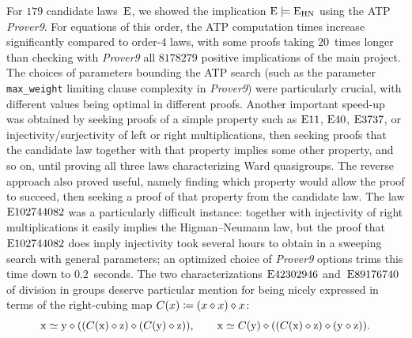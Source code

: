 For $179$ candidate laws~$\mathrm{E}$, we showed the implication $\mathrm{E}\models\mathrm{E}_{\mathrm{HN}}$ using the ATP \emph{Prover9}.  For equations of this order, the ATP computation times increase significantly compared to order-$4$ laws, with some proofs taking $20$~times longer than checking with \emph{Prover9} all $\num{8178279}$ positive implications of the main project.  The choices of parameters bounding the ATP search (such as the parameter \texttt{max\_weight} limiting clause complexity in \emph{Prover9}) were particularly crucial, with different values being optimal in different proofs.  Another important speed-up was obtained by seeking proofs of a simple property such as $\mathrm{E}11$, $\mathrm{E}40$, $\mathrm{E}3737$, or injectivity/surjectivity of left or right multiplications, then seeking proofs that the candidate law together with that property implies some other property, and so on, until proving all three laws characterizing Ward quasigroups.  The reverse approach also proved useful, namely finding which property would allow the proof to succeed, then seeking a proof of that property from the candidate law.  The law $\mathrm{E}102744082$ was a particularly difficult instance: together with injectivity of right multiplications it easily implies the Higman--Neumann law, but the proof that $\mathrm{E}102744082$ does imply injectivity took several hours to obtain in a sweeping search with general parameters; an optimized choice of \emph{Prover9} options trims this time down to $0.2$~seconds.  The two characterizations $\mathrm{E}42302946$ and~$\mathrm{E}89176740$ of division in groups deserve particular mention for being nicely expressed in terms of the right-cubing map $C(x) \coloneqq (x \diamond x) \diamond x$:
\[
  \mathrm{x} \simeq \mathrm{y} \diamond ((C(\mathrm{x}) \diamond \mathrm{z}) \diamond (C(\mathrm{y}) \diamond \mathrm{z})), \qquad
  \mathrm{x} \simeq C(\mathrm{y}) \diamond ((C(\mathrm{x}) \diamond \mathrm{z}) \diamond (\mathrm{y} \diamond \mathrm{z})).
\]

